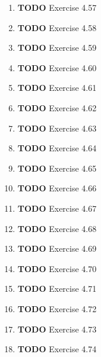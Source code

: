 \documentclass[11pt]{article}
\begin{document}
\begin{enumerate}
\begin{enumerate}
\item {\bfseries\sffamily TODO} Exercise 4.57
\label{sec:org983ab9a}

\item {\bfseries\sffamily TODO} Exercise 4.58
\label{sec:org03425b8}

\item {\bfseries\sffamily TODO} Exercise 4.59
\label{sec:org0156047}

\item {\bfseries\sffamily TODO} Exercise 4.60
\label{sec:orgd3d3945}

\item {\bfseries\sffamily TODO} Exercise 4.61
\label{sec:org9d1b8fa}

\item {\bfseries\sffamily TODO} Exercise 4.62
\label{sec:orga173ac0}

\item {\bfseries\sffamily TODO} Exercise 4.63
\label{sec:orge3fdfc6}

\item {\bfseries\sffamily TODO} Exercise 4.64
\label{sec:orgd557af1}

\item {\bfseries\sffamily TODO} Exercise 4.65
\label{sec:org25b210a}

\item {\bfseries\sffamily TODO} Exercise 4.66
\label{sec:org0ce2cf7}

\item {\bfseries\sffamily TODO} Exercise 4.67
\label{sec:org4dea589}

\item {\bfseries\sffamily TODO} Exercise 4.68
\label{sec:org41df83a}

\item {\bfseries\sffamily TODO} Exercise 4.69
\label{sec:org2bf1efd}

\item {\bfseries\sffamily TODO} Exercise 4.70
\label{sec:orgce544b4}

\item {\bfseries\sffamily TODO} Exercise 4.71
\label{sec:org9306b0c}

\item {\bfseries\sffamily TODO} Exercise 4.72
\label{sec:orge12bec0}

\item {\bfseries\sffamily TODO} Exercise 4.73
\label{sec:orgfe5e035}

\item {\bfseries\sffamily TODO} Exercise 4.74
\label{sec:org097e1ae}


\end{enumerate}
\end{enumerate}
\end{document}
